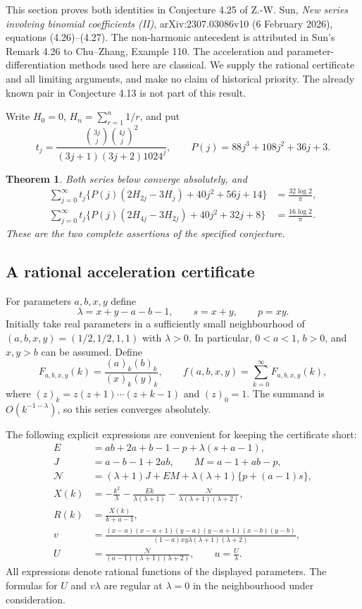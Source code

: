 \documentclass[11pt,a4paper]{article}
\newtheorem{theorem}{Theorem}[section]
\theoremstyle{remark}\newtheorem{remark}[theorem]{Remark}
\numberwithin{equation}{section}
\begin{document}
This section proves both identities in Conjecture 4.25 of Z.-W. Sun,
\emph{New series involving binomial coefficients (II)},
arXiv:2307.03086v10 (6 February 2026), equations (4.26)--(4.27).
The non-harmonic antecedent is attributed in Sun's Remark 4.26 to
Chu--Zhang, Example 110. The acceleration and parameter-differentiation
methods used here are classical. We supply the rational certificate and
all limiting arguments, and make no claim of historical priority.
The already known pair in Conjecture 4.13 is not part of this result.

Write $H_0=0$, $H_n=\sum_{r=1}^n1/r$, and put
\[
 t_j=\frac{\binom{3j}{j}\binom{4j}{j}^{2}}
 {(3j+1)(3j+2)1024^j},\qquad
 P(j)=88j^3+108j^2+36j+3.
\]
\begin{theorem}\label{thm:sun425-complete}
Both series below converge absolutely, and
\begin{align}
 \sum_{j=0}^{\infty}t_j\bigl\{
 P(j)(2H_{2j}-3H_j)+40j^2+56j+14\bigr\}
 &=\frac{32\log2}{\pi},\label{eq:s425-first}\\
 \sum_{j=0}^{\infty}t_j\bigl\{
 P(j)(2H_{4j}-3H_{2j})+40j^2+32j+8\bigr\}
 &=\frac{16\log2}{\pi}.\label{eq:s425-second}
\end{align}
These are the two complete assertions of the specified conjecture.
\end{theorem}

\subsection{A rational acceleration certificate}
For parameters $a,b,x,y$ define
\[
 \lambda=x+y-a-b-1,\qquad s=x+y,\qquad p=xy.
\]
Initially take real parameters in a sufficiently small neighbourhood of
$(a,b,x,y)=(1/2,1/2,1,1)$ with $\lambda>0$. In particular,
$0<a<1$, $b>0$, and $x,y>b$ can be assumed. Define
\[
 F_{a,b,x,y}(k)=\frac{(a)_k(b)_k}{(x)_k(y)_k},\qquad
 f(a,b,x,y)=\sum_{k=0}^{\infty}F_{a,b,x,y}(k),
\]
where $(z)_k=z(z+1)\cdots(z+k-1)$ and $(z)_0=1$.
The summand is $O(k^{-1-\lambda})$, so this series converges absolutely.

The following explicit expressions are convenient for keeping the
certificate short:
\begin{align*}
 E&=ab+2a+b-1-p+\lambda(s+a-1),\\
 J&=a-b-1+2ab,\qquad M=a-1+ab-p,\\
 \mathcal N&=(\lambda+1)J+EM
       +\lambda(\lambda+1)\{p+(a-1)s\},\\
 X(k)&=-\frac{k^2}{\lambda}
       -\frac{Ek}{\lambda(\lambda+1)}
       -\frac{\mathcal N}{\lambda(\lambda+1)(\lambda+2)},\\
 R(k)&=\frac{X(k)}{k+a-1},\\
 v&=\frac{(x-a)(x-a+1)(y-a)(y-a+1)(x-b)(y-b)}
 {(1-a)xy\lambda(\lambda+1)(\lambda+2)},\\
 U&=\frac{\mathcal N}{(a-1)(\lambda+1)(\lambda+2)},
 \qquad u=\frac{U}{\lambda}.
\end{align*}
All expressions denote rational functions of the displayed parameters.
The formulas for $U$ and $v\lambda$ are regular at $\lambda=0$
in the neighbourhood under consideration.
\end{document}
